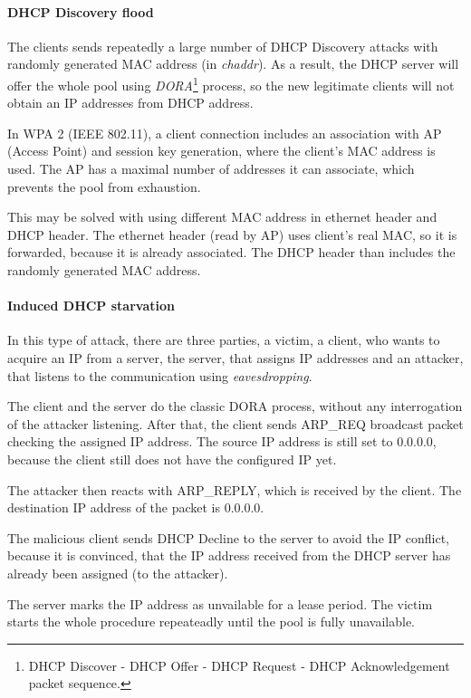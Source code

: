 \documentclass[10pt,a4paper,titlepage]{article}
\begin{document}
\paragraph{DHCP Discovery flood}
The clients sends repeatedly a large number of DHCP Discovery attacks with 
randomly generated MAC address (in {\it chaddr}). As a result, the DHCP server will
offer the whole pool using {\it DORA}\footnote{DHCP Discover - DHCP Offer - DHCP
Request - DHCP Acknowledgement packet sequence.} process, so the new legitimate
clients will not obtain an IP addresses from DHCP address.

In WPA 2 (IEEE 802.11), a client connection includes an association with AP
(Access Point) and session key generation, where the client's MAC address is used.
The AP has a maximal number of addresses it can associate, which prevents
the pool from exhaustion.

This may be solved with using different MAC address in ethernet header and
DHCP header. The ethernet header (read by AP) uses client's real MAC, so
it is forwarded, because it is already associated. The DHCP header than includes
the randomly generated MAC address.

\paragraph{Induced DHCP starvation}
In this type of attack, there are three parties, a victim, a client, who wants to
acquire an IP from a server, the server, that assigns IP addresses and an
attacker, that listens to the communication using {\it eavesdropping}. 

The client and the server do the classic DORA process, without any interrogation
of the attacker listening. After that, the client sends ARP\_REQ broadcast packet
checking the assigned IP address. The source IP address is still set to 0.0.0.0,
because the client still does not have the configured IP yet.

The attacker then reacts with ARP\_REPLY, which is received by the client.
The destination IP address of the packet is 0.0.0.0.

The malicious client sends DHCP Decline to the server to avoid the IP conflict,
because it is convinced, that the IP address received from the DHCP server
has already been assigned (to the attacker).

The server marks the IP address as unvailable for a lease period. The victim starts
the whole procedure repeateadly until the pool is fully unavailable.
\cite{IBSattack}
\end{document}
